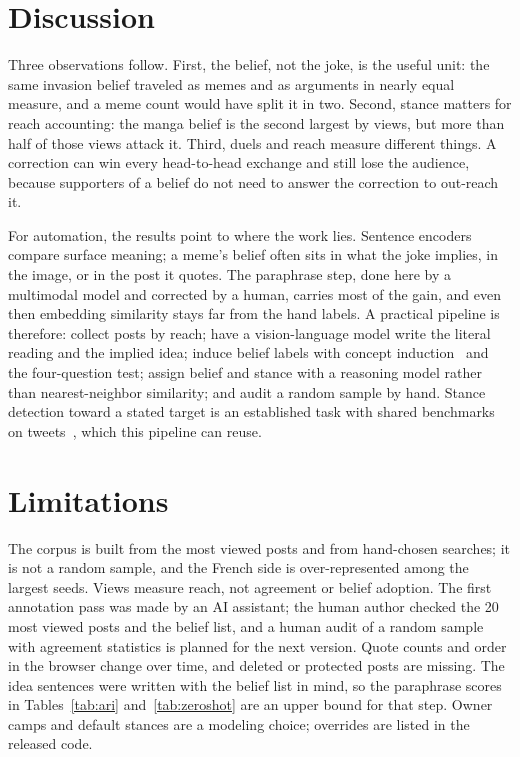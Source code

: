 \documentclass[10pt,a4paper]{article}
\begin{document}
\section{Discussion}
Three observations follow. First, the belief, not the joke, is the useful unit: the same invasion belief traveled as memes and as arguments in nearly equal measure, and a meme count would have split it in two. Second, stance matters for reach accounting: the manga belief is the second largest by views, but more than half of those views attack it. Third, duels and reach measure different things. A correction can win every head-to-head exchange and still lose the audience, because supporters of a belief do not need to answer the correction to out-reach it.

For automation, the results point to where the work lies. Sentence encoders compare surface meaning; a meme's belief often sits in what the joke implies, in the image, or in the post it quotes. The paraphrase step, done here by a multimodal model and corrected by a human, carries most of the gain, and even then embedding similarity stays far from the hand labels. A practical pipeline is therefore: collect posts by reach; have a vision-language model write the literal reading and the implied idea; induce belief labels with concept induction~\cite{lloom,topicgpt} and the four-question test; assign belief and stance with a reasoning model rather than nearest-neighbor similarity; and audit a random sample by hand. Stance detection toward a stated target is an established task with shared benchmarks on tweets~\cite{semeval}, which this pipeline can reuse.

\section{Limitations}
The corpus is built from the most viewed posts and from hand-chosen searches; it is not a random sample, and the French side is over-represented among the largest seeds. Views measure reach, not agreement or belief adoption. The first annotation pass was made by an AI assistant; the human author checked the 20 most viewed posts and the belief list, and a human audit of a random sample with agreement statistics is planned for the next version. Quote counts and order in the browser change over time, and deleted or protected posts are missing. The idea sentences were written with the belief list in mind, so the paraphrase scores in Tables~\ref{tab:ari} and~\ref{tab:zeroshot} are an upper bound for that step. Owner camps and default stances are a modeling choice; overrides are listed in the released code.
\end{document}

